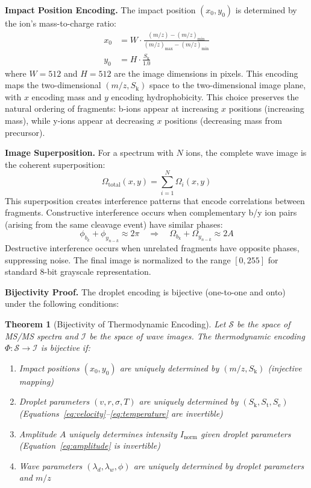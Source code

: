 \documentclass[11pt,twocolumn]{article}
\newcommand{\Sk}{S_{\text{k}}}
\newcommand{\St}{S_{\text{t}}}
\newcommand{\Se}{S_{\text{e}}}
\newcommand{\msms}{MS/MS}
\newtheorem{theorem}{Theorem}[section]
\begin{document}
\textbf{Impact Position Encoding.} The impact position $(x_0, y_0)$ is determined by the ion's mass-to-charge ratio:
\begin{align}
    x_0 &= W \cdot \frac{(m/z) - (m/z)_{\min}}{(m/z)_{\max} - (m/z)_{\min}} \\
    y_0 &= H \cdot \frac{\Sk}{1.0}
\end{align}
where $W = 512$ and $H = 512$ are the image dimensions in pixels. This encoding maps the two-dimensional $(m/z, \Sk)$ space to the two-dimensional image plane, with $x$ encoding mass and $y$ encoding hydrophobicity. This choice preserves the natural ordering of fragments: b-ions appear at increasing $x$ positions (increasing mass), while y-ions appear at decreasing $x$ positions (decreasing mass from precursor).

\textbf{Image Superposition.} For a spectrum with $N$ ions, the complete wave image is the coherent superposition:
\begin{equation}
    \Omega_{\text{total}}(x, y) = \sum_{i=1}^{N} \Omega_i(x, y)
    \label{eq:superposition}
\end{equation}
This superposition creates interference patterns that encode correlations between fragments. Constructive interference occurs when complementary b/y ion pairs (arising from the same cleavage event) have similar phases:
\begin{equation}
    \phi_{b_k} + \phi_{y_{n-k}} \approx 2\pi \quad \Rightarrow \quad \Omega_{b_k} + \Omega_{y_{n-k}} \approx 2A
\end{equation}
Destructive interference occurs when unrelated fragments have opposite phases, suppressing noise. The final image is normalized to the range $[0, 255]$ for standard 8-bit grayscale representation.

\textbf{Bijectivity Proof.} The droplet encoding is bijective (one-to-one and onto) under the following conditions:

\begin{theorem}[Bijectivity of Thermodynamic Encoding]
Let $\mathcal{S}$ be the space of \msms{} spectra and $\mathcal{I}$ be the space of wave images. The thermodynamic encoding $\Phi: \mathcal{S} \rightarrow \mathcal{I}$ is bijective if:
\begin{enumerate}[leftmargin=*]
    \item Impact positions $(x_0, y_0)$ are uniquely determined by $(m/z, \Sk)$ (injective mapping)
    \item Droplet parameters $(v, r, \sigma, T)$ are uniquely determined by $(\Sk, \St, \Se)$ (Equations~\ref{eq:velocity}--\ref{eq:temperature} are invertible)
    \item Amplitude $A$ uniquely determines intensity $I_{\text{norm}}$ given droplet parameters (Equation~\ref{eq:amplitude} is invertible)
    \item Wave parameters $(\lambda_d, \lambda_w, \phi)$ are uniquely determined by droplet parameters and $m/z$
\end{enumerate}
\end{theorem}
\end{document}
